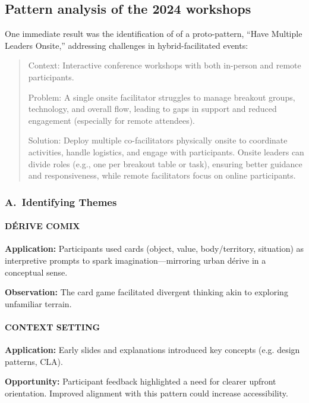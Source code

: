 \documentclass[acmlarge,timestamp]{acmart}
\begin{document}
\subsection*{Pattern analysis of the 2024 workshops}

One immediate result was the identification of of a proto-pattern,
“Have Multiple Leaders Onsite,” addressing challenges in
hybrid-facilitated events:

\begin{quote}
Context: Interactive conference workshops with both in-person and
remote participants.

Problem: A single onsite facilitator struggles to manage breakout
groups, technology, and overall flow, leading to gaps in support and
reduced engagement (especially for remote attendees).

Solution: Deploy multiple co-facilitators physically onsite to
coordinate activities, handle logistics, and engage with
participants. Onsite leaders can divide roles (e.g., one per breakout
table or task), ensuring better guidance and responsiveness, while
remote facilitators focus on online participants.
\end{quote}


\medskip

\subsubsection*{A.~Identifying Themes}

\paragraph*{DÉRIVE COMIX}

\noindent \textbf{Application:} Participants used cards (object, value, body/territory, situation) as interpretive prompts to spark imagination—mirroring  urban dérive in a conceptual sense.

\noindent \textbf{Observation:} The card game facilitated divergent thinking akin to exploring unfamiliar terrain.

\paragraph*{CONTEXT SETTING}

\noindent \textbf{Application:} Early slides and explanations introduced key concepts (e.g. design patterns, CLA).

\noindent \textbf{Opportunity:} Participant feedback highlighted a need for clearer upfront orientation. Improved alignment with this pattern could increase accessibility.
\end{document}

